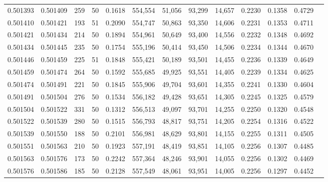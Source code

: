 \begin{tabular}{rrrrrrrrrrrrr}
0.501393 & 0.501409 & 259 &  50 &                                     0.1618 & 554,554 &  51,056 &  93,299 &  14,657 & 0.2230 & 0.1358 & 0.4729 \\
0.501410 & 0.501421 & 193 &  51 &                                     0.2090 & 554,747 &  50,863 &  93,350 &  14,606 & 0.2231 & 0.1353 & 0.4711 \\
0.501421 & 0.501434 & 214 &  50 &                                     0.1894 & 554,961 &  50,649 &  93,400 &  14,556 & 0.2232 & 0.1348 & 0.4692 \\
0.501434 & 0.501445 & 235 &  50 &                                     0.1754 & 555,196 &  50,414 &  93,450 &  14,506 & 0.2234 & 0.1344 & 0.4670 \\
0.501446 & 0.501459 & 225 &  51 &                                     0.1848 & 555,421 &  50,189 &  93,501 &  14,455 & 0.2236 & 0.1339 & 0.4649 \\
0.501459 & 0.501474 & 264 &  50 &                                     0.1592 & 555,685 &  49,925 &  93,551 &  14,405 & 0.2239 & 0.1334 & 0.4625 \\
0.501474 & 0.501491 & 221 &  50 &                                     0.1845 & 555,906 &  49,704 &  93,601 &  14,355 & 0.2241 & 0.1330 & 0.4604 \\
0.501491 & 0.501504 & 276 &  50 &                                     0.1534 & 556,182 &  49,428 &  93,651 &  14,305 & 0.2245 & 0.1325 & 0.4579 \\
0.501504 & 0.501522 & 331 &  50 &                                     0.1312 & 556,513 &  49,097 &  93,701 &  14,255 & 0.2250 & 0.1320 & 0.4548 \\
0.501522 & 0.501539 & 280 &  50 &                                     0.1515 & 556,793 &  48,817 &  93,751 &  14,205 & 0.2254 & 0.1316 & 0.4522 \\
0.501539 & 0.501550 & 188 &  50 &                                     0.2101 & 556,981 &  48,629 &  93,801 &  14,155 & 0.2255 & 0.1311 & 0.4505 \\
0.501551 & 0.501563 & 210 &  50 &                                     0.1923 & 557,191 &  48,419 &  93,851 &  14,105 & 0.2256 & 0.1307 & 0.4485 \\
0.501563 & 0.501576 & 173 &  50 &                                     0.2242 & 557,364 &  48,246 &  93,901 &  14,055 & 0.2256 & 0.1302 & 0.4469 \\
0.501576 & 0.501586 & 185 &  50 &                                     0.2128 & 557,549 &  48,061 &  93,951 &  14,005 & 0.2256 & 0.1297 & 0.4452 \\

\end{tabular}
